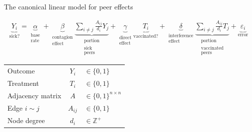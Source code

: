 \documentclass[aspectratio=169]{beamer}
\theoremstyle{remark}
\begin{document}
\begin{frame}{The canonical linear model for peer effects}
    
    \begin{align*}
        \underbrace{Y_i}_\text{sick?} =
        \underbrace{\alpha}_{\substack{\text{base}                                    \\ \text{rate}}} +
        \underbrace{\beta}_{\substack{\text{contagion}                                \\ \text{effect}}}
        \underbrace{\sum_{i \neq j} \frac{A_{ij}}{d_i} Y_j}_{\substack{\text{portion} \\ \text{sick} \\ \text{peers}}} + 
        \underbrace{\gamma}_{\substack{\text{direct}                                  \\ \text{effect}}}
        \underbrace{T_i}_\text{vaccinated?} + 
        \underbrace{\delta}_{\substack{\text{interference}                            \\ \text{effect}}}
        \underbrace{\sum_{i \neq j} \frac{A_{ij}}{d_i} T_j}_{\substack{\text{portion} \\ \text{vaccinated} \\ \text{peers}}} +
        \underbrace{\varepsilon_i}_\text{error}
    \end{align*}
    
    {
    \begin{table}[]
        \begin{tabular}{lcl}
            Outcome          & $Y_i$    & $\in \{0, 1\}$              \\
            Treatment        & $T_i$    & $\in \{0, 1\}$              \\
            Adjacency matrix & $A$      & $\in \{0, 1\}^{n \times n}$ \\
            Edge $i \sim j$  & $A_{ij}$ & $\in \{0, 1\}$              \\
            Node degree      & $d_i$    & $\in \mathbb{Z}^+$          \\
        \end{tabular}
    \end{table}
    }
\end{frame}
\end{document}
